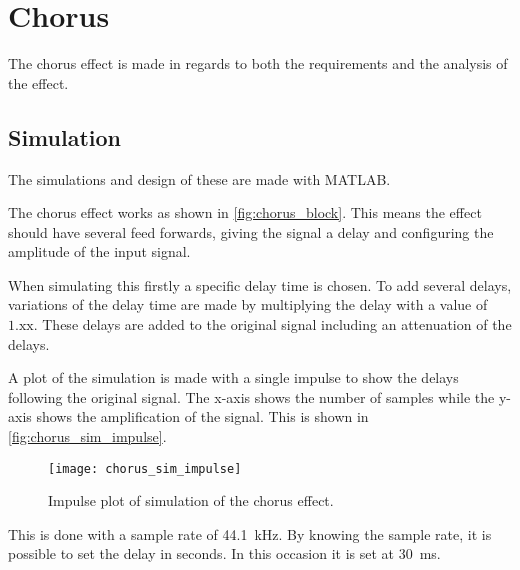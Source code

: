 \section{Chorus}\label{sec:chorus_design}
The chorus effect is made in regards to both the requirements and the analysis of the effect.

\subsection{Simulation}
The simulations and design of these are made with MATLAB.

The chorus effect works as shown in \autoref{fig:chorus_block}. This means the effect should have several feed forwards, giving the signal a delay and configuring the amplitude of the input signal.

When simulating this firstly a specific delay time is chosen. To add several delays, variations of the delay time are made by multiplying the delay with a value of $1.\text{xx}$. These delays are added to the original signal including an attenuation of the delays. 

A plot of the simulation is made with a single impulse to show the delays following the original signal. The x-axis shows the number of samples while the y-axis shows the amplification of the signal. This is shown in \autoref{fig:chorus_sim_impulse}.

\begin{figure}[htbp]
	\centering
	\texttt{[image: chorus\_sim\_impulse]}
	\caption{Impulse plot of simulation of the chorus effect.}
	\label{fig:chorus_sim_impulse}
\end{figure}

This is done with a sample rate of \SI{44.1}{\kilo\hertz}. By knowing the sample rate, it is possible to set the delay in seconds. In this occasion it is set at \SI{30}{\milli\second}.

